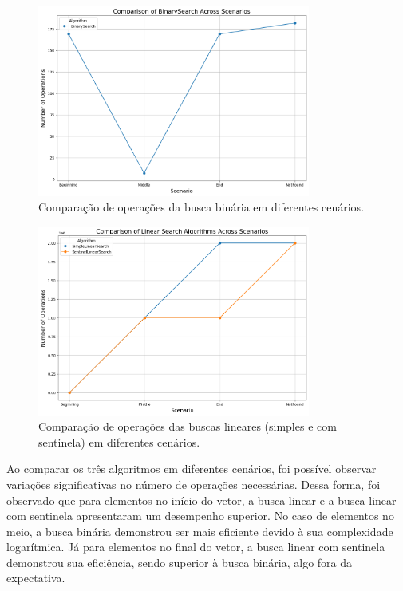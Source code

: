 \documentclass[12pt]{article}
\begin{document}
\begin{figure}[!h]
    \centering
    \includegraphics[width=0.8\textwidth]{binary_search_comparison_plot.png}
    \caption{Comparação de operações da busca binária em diferentes cenários.}
    \label{fig:binary-comparison}
\end{figure}

\begin{figure}[!h]
    \centering
    \includegraphics[width=0.8\textwidth]{linear_search_comparison_plot.png}
    \caption{Comparação de operações das buscas lineares (simples e com sentinela) em diferentes cenários.}
    \label{fig:linear-comparison}
\end{figure}

\newpage
Ao comparar os três algoritmos em diferentes cenários, foi possível observar variações significativas no número de operações necessárias. Dessa forma, foi observado que para elementos no início do vetor, a busca linear e a busca linear com sentinela apresentaram um desempenho superior. No caso de elementos no meio, a busca binária demonstrou ser mais eficiente devido à sua complexidade logarítmica. Já para elementos no final do vetor, a busca linear com sentinela demonstrou sua eficiência, sendo superior à busca binária, algo fora da expectativa.
\end{document}
